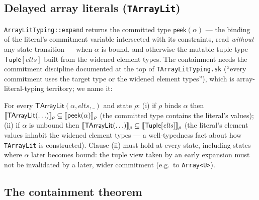 \documentclass[11pt]{article}
\begin{document}
\subsection{Delayed array literals (\texttt{TArrayLit})}
\label{sec:arraylit}

\texttt{ArrayLitTyping::expand} returns the committed type
$\mathsf{peek}(\alpha)$ — the binding of the literal's commitment
variable intersected with its constraints, read \emph{without} any state
transition — when $\alpha$ is bound, and otherwise the mutable tuple
type $\mathsf{Tuple}[\mathit{elts}]$ built from the widened element
types. The containment needs the commitment discipline documented at the
top of \texttt{TArrayLitTyping.sk} (``every commitment uses the target
type or the widened element types''), which is array-literal-typing
territory; we name it:

\begin{axiom}
\label{ax:earr}
For every $\mathsf{TArrayLit}(\alpha, \mathit{elts}, \_)$ and state
$\rho$: (i) if $\rho$ binds $\alpha$ then
$\llbracket \mathsf{TArrayLit}(\ldots) \rrbracket_\rho \subseteq
\llbracket \mathsf{peek}(\alpha) \rrbracket_\rho$ (the committed type contains the
literal's values); (ii) if $\alpha$ is unbound then
$\llbracket \mathsf{TArrayLit}(\ldots) \rrbracket_\rho \subseteq
\llbracket \mathsf{Tuple}[\mathit{elts}] \rrbracket_\rho$ (the literal's element values
inhabit the widened element types — a well-typedness fact about
how \texttt{TArrayLit} is constructed). Clause (ii) must hold at every
state, including states where $\alpha$ later becomes bound: the tuple
view taken by an early expansion must not be invalidated by a later,
wider commitment (e.g.\ to \texttt{Array<U>}).
\end{axiom}

\subsection{The containment theorem}
\end{document}
